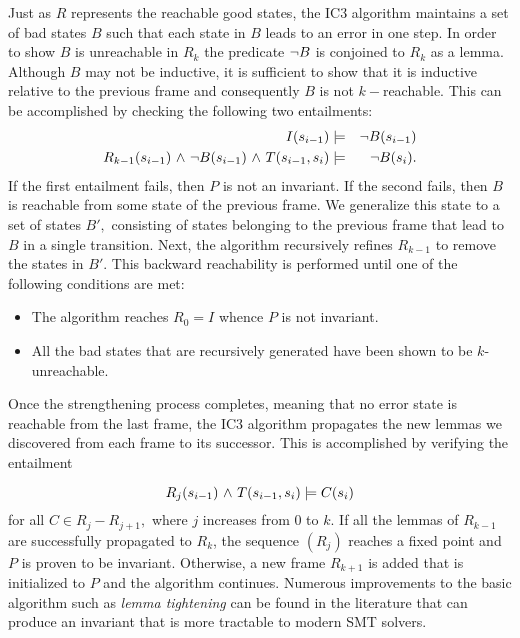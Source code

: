 Just as $R$ represents the reachable good states, the IC3 algorithm
maintains a set of bad states $B$ such that each state in $B$ leads to
an error in one step.  In order to show $B$ is unreachable in $R_k$
the predicate ${\neg} B$ is conjoined to $R_k$ as a lemma.  Although
$B$ may not be inductive, it is sufficient to show that it is
inductive relative to the previous frame and consequently $B$ is not
$k-$reachable.  This can be accomplished by checking the following two
entailments:
\begin{eqnarray*}
I(s_{i-1}) & \models & {\neg} B(s_{i-1}) \\ 
R_{k-1} (s_{i-1}) {\ \wedge \ } {\neg}  B(s_{i-1}) {\ \wedge \ } T(s_{i-1}, s_i) 
& \models & {\neg} B(s_i).
\end{eqnarray*}
If the first entailment fails, then $P$ is not an invariant. If the
second fails,  then $B$ is reachable from some state of the previous
frame. We generalize this state to a set of states $B',$ consisting of
states belonging to the previous frame that lead to $B$ in a single
transition.  Next, the algorithm recursively refines $R_{k-1}$ to
remove the states in $B'.$ This backward reachability is performed
until one of the following conditions are met:
\begin{itemize}
\item The algorithm reaches $R_0 = I$ whence $P$ is not invariant. 
\item All the bad states that are recursively generated have been
  shown to be $k$-unreachable. 
\end{itemize} 

Once the strengthening process completes, meaning that no error state
is reachable from the last frame, the IC3 algorithm propagates the new
lemmas we discovered from each frame to its successor. This is
accomplished by verifying the entailment

$$ R_j(s_{i-1}) {\ \wedge \ }  T(s_{i-1}, s_i)  \models C(s_i)$$
for all $C \in R_j - R_{j+1},$ where $j$ increases from $0$ to $k.$
If all the lemmas of $R_{k-1}$ are successfully propagated to $R_k$,
the sequence $(R_j)$ reaches a fixed point and $P$ is proven to be
invariant.  Otherwise,  a new frame $R_{k+1}$ is added that is  initialized to $P$
and the algorithm continues.  Numerous improvements to the basic
algorithm such as {\em lemma tightening} can be found in the
literature that can produce an invariant that is more tractable to
modern SMT solvers. 



